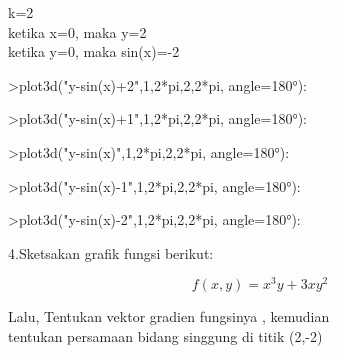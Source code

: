 \documentclass{article}
\begin{document}
\begin{eulernotebook}
\begin{eulercomment}
\begin{eulercomment}
\begin{eulercomment}
\begin{eulercomment}
\begin{eulercomment}
\begin{eulercomment}
\begin{eulercomment}
k=2\\
ketika x=0, maka y=2\\
ketika y=0, maka sin(x)=-2
\end{eulercomment}
\begin{eulerprompt}
>plot3d("y-sin(x)+2",1,2*pi,2,2*pi, angle=180°):
\end{eulerprompt}
\begin{eulerprompt}
>plot3d("y-sin(x)+1",1,2*pi,2,2*pi, angle=180°):
\end{eulerprompt}
\begin{eulerprompt}
>plot3d("y-sin(x)",1,2*pi,2,2*pi, angle=180°):
\end{eulerprompt}
\begin{eulerprompt}
>plot3d("y-sin(x)-1",1,2*pi,2,2*pi, angle=180°):
\end{eulerprompt}
\begin{eulerprompt}
>plot3d("y-sin(x)-2",1,2*pi,2,2*pi, angle=180°):
\end{eulerprompt}
\eulersubheading{}
\begin{eulercomment}
4.Sketsakan grafik fungsi berikut:\\
\end{eulercomment}
\begin{eulerformula}
\[
f(x,y)=x^3y+3xy^2
\]
\end{eulerformula}
\begin{eulercomment}
Lalu, Tentukan vektor gradien fungsinya , kemudian\\
tentukan persamaan bidang singgung di titik (2,-2)


\end{eulercomment}
\end{eulercomment}
\end{eulercomment}
\end{eulercomment}
\end{eulercomment}
\end{eulercomment}
\end{eulercomment}
\end{eulernotebook}
\end{document}

